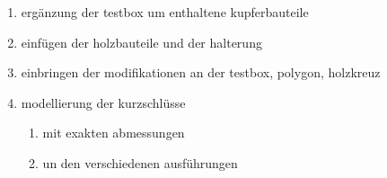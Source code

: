             \begin{enumerate}
                \item ergänzung der testbox um enthaltene kupferbauteile
                \item einfügen der holzbauteile und der halterung
                \item einbringen der modifikationen an der testbox, polygon, holzkreuz
                \item modellierung der kurzschlüsse
                \begin{enumerate}
                    \item mit exakten abmessungen
                    \item un den verschiedenen ausführungen
                \end{enumerate}
            \end{enumerate}
